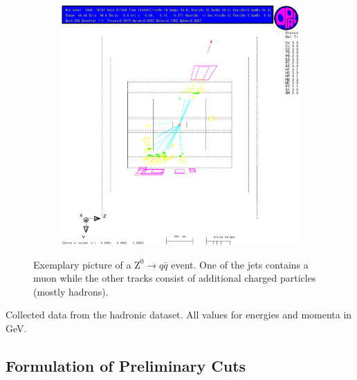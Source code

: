 \documentclass[11pt, a4paper]{article}
\numberwithin{equation}{section}
\begin{document}
\begin{figure}[h]
	\ContinuedFloat
	\begin{subfigure}{\textwidth}
		\centering
		\includegraphics[width=.9\textwidth]{./data/tag1/qq_pics/cropped/qq_04_side}
	\end{subfigure}
	\caption{Exemplary picture of a $\mathrm{Z}^0\rightarrow q\bar{q}$ event. One of the jets contains a muon while the other tracks consist of additional charged particles (mostly hadrons).}
	\label{fig:eventdisplay_qq}
\end{figure}
\begin{table}
	\centering
	
	\caption{Collected data from the hadronic dataset. All values for energies and momenta in \si{GeV}.}
	\label{tab:eventdisplay_qq}
\end{table}
\clearpage

\subsection{Formulation of Preliminary Cuts}
\end{document}
